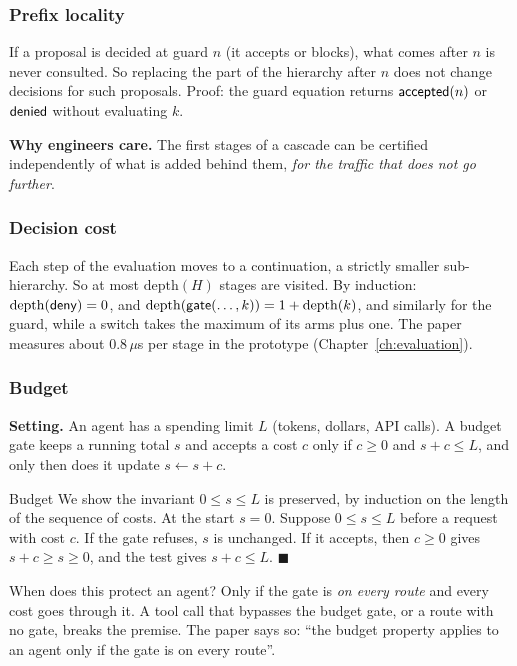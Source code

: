 \subsubsection{Prefix locality}

If a proposal is decided at guard $n$ (it accepts or blocks), what comes after $n$ is never consulted. So replacing the part of the hierarchy after $n$ does not change decisions for such proposals. Proof: the guard equation returns $\mathsf{accepted}(n)$ or $\mathsf{denied}$ without evaluating $k$.

\textbf{Why engineers care.} The first stages of a cascade can be certified independently of what is added behind them, \emph{for the traffic that does not go further}.

\subsubsection{Decision cost}

Each step of the evaluation moves to a continuation, a strictly smaller sub-hierarchy. So at most $\mathrm{depth}(H)$ stages are visited. By induction: $\mathrm{depth}(\mathsf{deny})=0$, and $\mathrm{depth}(\mathsf{gate}(\ldots,k))=1+\mathrm{depth}(k)$, and similarly for the guard, while a switch takes the maximum of its arms plus one. The paper measures about $0.8\,\mu$s per stage in the prototype (Chapter~\ref{ch:evaluation}).

\subsubsection{Budget}

\textbf{Setting.} An agent has a spending limit $L$ (tokens, dollars, API calls). A budget gate keeps a running total $s$ and accepts a cost $c$ only if $c\ge0$ and $s+c\le L$, and only then does it update $s\leftarrow s+c$.

\begin{plainproof}{Budget}
We show the invariant $0\le s\le L$ is preserved, by induction on the length of the sequence of costs. At the start $s=0$. Suppose $0\le s\le L$ before a request with cost $c$. If the gate refuses, $s$ is unchanged. If it accepts, then $c\ge0$ gives $s+c\ge s\ge0$, and the test gives $s+c\le L$. \hfill$\blacksquare$
\end{plainproof}

\begin{warning}{When does this protect an agent?}
Only if the gate is \emph{on every route} and every cost goes through it. A tool call that bypasses the budget gate, or a route with no gate, breaks the premise. The paper says so: ``the budget property applies to an agent only if the gate is on every route''.
\end{warning}

